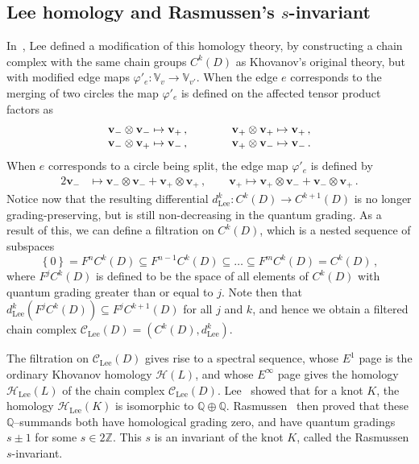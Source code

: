 \documentclass[11pt]{article}
\numberwithin{equation}{section}
\begin{document}
\subsection{Lee homology and Rasmussen's $s$-invariant}
\label{sec:leehomology}
In~\cite{lee2008khovanov}, Lee defined a modification of this homology theory, by constructing a chain complex with the same chain groups $C^k(D)$ as Khovanov's original theory, but with modified edge maps $\varphi'_e:\mathbb{V}_v \rightarrow \mathbb{V}_{v'}$.
When the edge $e$ corresponds to the merging of two circles the map $\varphi'_e$ is defined on the affected tensor product factors as
\begin{equation}
\begin{array}{lcl}
\mathbf{v}_- \otimes \mathbf{v}_- \mapsto \mathbf{v}_+ \,, &\qquad&
\mathbf{v}_+ \otimes \mathbf{v}_+ \mapsto \mathbf{v}_+ \,, \cr
\mathbf{v}_- \otimes \mathbf{v}_+ \mapsto \mathbf{v}_- \,, &\qquad&
\mathbf{v}_+ \otimes \mathbf{v}_- \mapsto \mathbf{v}_- \,.
\end{array}
\end{equation}
When $e$ corresponds to a circle being split, the edge map $\varphi'_e$ is defined by
\begin{alignat}{2}
\mathbf{v}_- &\mapsto \mathbf{v}_- \otimes \mathbf{v}_- + \mathbf{v}_+ \otimes \mathbf{v}_+ \,, \qquad \mathbf{v}_+ \mapsto \mathbf{v}_+ \otimes \mathbf{v}_- + \mathbf{v}_- \otimes \mathbf{v}_+ \,.
\end{alignat}
Notice now that the resulting differential $d^k_\text{Lee}: C^k(D) \rightarrow C^{k+1}(D)$ is no longer grading-preserving, but is still non-decreasing in the quantum grading.
As a result of this, we can define a filtration on $C^k(D)$, which is a nested sequence of subspaces
\begin{equation}
\left\{0\right\} = F^nC^k(D) \subseteq F^{n-1}C^k(D) \subseteq \ldots \subseteq F^m C^k(D) = C^k(D) \,,
\end{equation}
where $F^jC^k(D)$ is defined to be the space of all elements of $C^k(D)$ with quantum grading greater than or equal to $j$.
Note then that $d^k_\text{Lee}(F^jC^k(D)) \subseteq F^jC^{k+1}(D)$ for all $j$ and $k$, and hence we obtain a filtered chain complex $\mathcal{C}_\text{Lee}(D)=(C^k(D),d_\text{Lee}^k)$.

The filtration on $\mathcal{C}_\text{Lee}(D)$ gives rise to a spectral sequence, whose $E^1$ page is the ordinary Khovanov homology $\mathcal{H}(L)$, and whose $E^\infty$ page gives the homology $\mathcal{H}_\text{Lee}(L)$ of the chain complex $\mathcal{C}_\text{Lee}(D)$.
Lee~\cite{lee2008khovanov} showed that for a knot $K$, the homology  $\mathcal{H}_\text{Lee}(K)$ is isomorphic to $\mathbb{Q} \oplus \mathbb{Q}$.
Rasmussen~\cite{rasmussen2010khovanov} then proved that these $\mathbb{Q}$--summands  both have homological grading zero, and have quantum gradings $s \pm 1$ for some $s \in 2 \mathbb{Z}$.
This $s$ is an invariant of the knot $K$, called the Rasmussen $s$-invariant.
\end{document}
